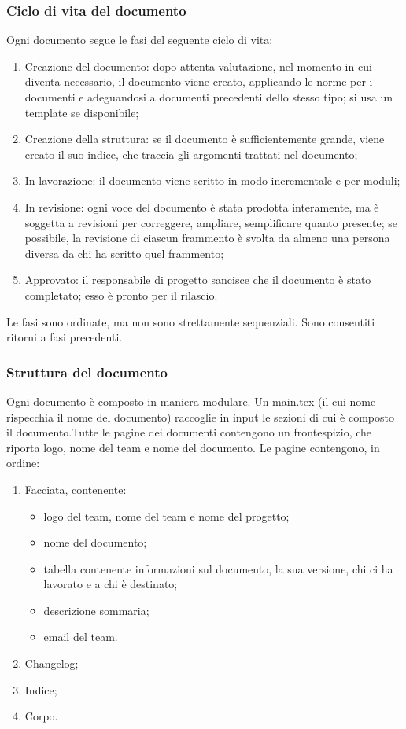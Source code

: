 		\subsubsection{Ciclo di vita del documento}
		Ogni documento segue le fasi del seguente ciclo di vita:
		\begin{enumerate}
			\item Creazione del documento: dopo attenta valutazione, nel momento in cui diventa necessario, il documento viene creato, applicando le norme per i documenti e adeguandosi a documenti precedenti dello stesso tipo; si usa un template se disponibile;
			\item Creazione della struttura: se il documento è sufficientemente grande, viene creato il suo indice, che traccia gli argomenti trattati nel documento;
			\item In lavorazione: il documento viene scritto in modo incrementale e per moduli;
			\item In revisione: ogni voce del documento è stata prodotta interamente, ma è soggetta a revisioni per correggere, ampliare, semplificare quanto presente; se possibile, la revisione di ciascun frammento è svolta da almeno una persona diversa da chi ha scritto quel frammento;
			\item Approvato: il responsabile di progetto sancisce che il documento è stato completato; esso è pronto per il rilascio.
		\end{enumerate}
		Le fasi sono ordinate, ma non sono strettamente sequenziali. Sono consentiti ritorni a fasi precedenti.
		\subsubsection{Struttura del documento}
		Ogni documento è composto in maniera modulare. Un main.tex (il cui nome rispecchia il nome del documento) raccoglie in input le sezioni di cui è composto il documento.\newline Tutte le pagine dei documenti contengono un frontespizio, che riporta logo, nome del team e nome del documento. Le pagine contengono, in ordine:
		\begin{enumerate}
			\item Facciata, contenente:
			\begin{itemize}
				\item logo del team, nome del team e nome del progetto;
				\item nome del documento;
				\item tabella contenente informazioni sul documento, la sua versione, chi ci ha lavorato e a chi è destinato;
				\item descrizione sommaria;
				\item email del team.
			\end{itemize}
			\item Changelog;
			\item Indice;
			\item Corpo.
		\end{enumerate}
